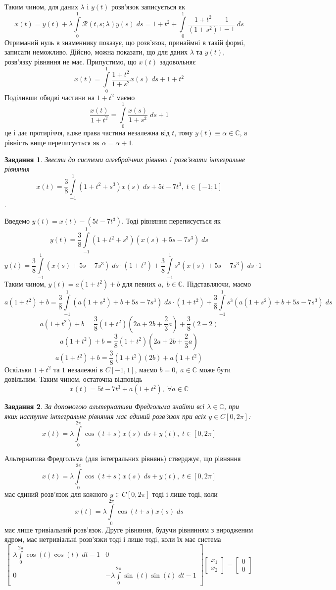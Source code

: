 \documentclass[10pt]{article}
\newtheorem{prob}{Завдання}
\newcommand{\ds}{\;ds}
\let\oldint\int
\renewcommand{\int}{\oldint\limits}
\begin{document}
	Таким чином, для даних $\lambda$ і $y(t)$ розв’язок записується як
	\[x(t)=y(t)+\lambda\int_{0}^1\mathcal{R}(t, s;\lambda)y( s)\;d s=1+t^2+\int_{0}^1\frac{1+t^2}{(1+s^2)}\frac{1}{1-1}\ds\]
	Отриманий нуль в знаменнику показує, що розв’язок, принаймні в такій формі, записати неможливо. Дійсно, можна показати, що для даних
	$\lambda$ та $y(t)$, розв’язку рівняння не має. Припустимо, що $x(t)$ задовольняє
	\[x(t)=\int_0^1\frac{1+t^2}{1+s^2}x(s)\ds+1+t^2\]
	Поділивши обидві частини на $1+t^2$ маємо
	\[\frac{x(t)}{1+t^2}=\int_0^1\frac{x(s)}{1+s^2}\ds+1\]
	це і дає протиріччя, адже права частина незалежна від $t$, тому $y(t)\equiv\alpha\in\mathbb{C}$, а рівність вище переписується як
	$\alpha=\alpha+1$.
\begin{prob}Звести до системи алгебраїчних рівнянь і розв’язати інтегральне рівняння
	\[x(t)=\frac{3}{8}\int_{-1}^1(1+t^2+s^3)x(s)\ds+5t-7t^3,\;t\in[-1;1]\].
\end{prob}
Введемо $y(t)=x(t)-(5t-7t^3)$. Тоді рівняння переписується як
	\[y(t)=\frac{3}{8}\int_{-1}^1(1+t^2+s^3)(x(s)+5s-7s^3)\ds\]
	\[y(t)=\frac{3}{8}\int_{-1}^1(x(s)+5s-7s^3)\ds\cdot(1+t^2)+\frac{3}{8}\int_{-1}^1s^3(x(s)+5s-7s^3)\ds\cdot1\]
	Таким чином, $y(t)=a(1+t^2)+b$ для певних $a,\;b\in\mathbb{C}$. Підставляючи, маємо
	\[a(1+t^2)+b=\frac{3}{8}\int_{-1}^1(a(1+s^2)+b+5s-7s^3)\ds\cdot(1+t^2)+\frac{3}{8}\int_{-1}^1s^3(a(1+s^2)+b+5s-7s^3)\ds\]
	\[a(1+t^2)+b=\frac{3}{8}(1+t^2)(2a+2b+\frac{2}{3}a)+\frac{3}{8}(2-2)\]
	\[a(1+t^2)+b=\frac{3}{8}(1+t^2)(2a+2b+\frac{2}{3}a)\]
	\[a(1+t^2)+b=\frac{3}{8}(1+t^2)(2b)+a(1+t^2)\]
	Оскільки $1+t^2$ та $1$ незалежні в $C[-1,1]$, маємо $b=0,\;a\in\mathbb{C}$ може бути довільним. Таким чином, остаточна відповідь
	\[x(t)=5t-7t^3+a(1+t^2),\;\forall a\in\mathbb{C}\]
\begin{prob}За допомогою альтернативи Фредгольма знайти всі $\lambda\in\mathbb{C}$, при яких наступне інтегральне рівняння має єдиний
	розв’язок при всіх $y\in C[0,2\pi]$:
	\[x(t)=\lambda\int_0^{2\pi}\cos(t+s)x(s)\ds+y(t),\;t\in[0,2\pi]\]
\end{prob}
Альтернатива Фредгольма (для інтегральних рівнянь) стверджує, що рівняння 
	\[x(t)=\lambda\int_0^{2\pi}\cos(t+s)x(s)\ds+y(t),\;t\in[0,2\pi]\]
	має єдиний розв’язок для кожного $y\in C[0,2\pi]$ тоді і лише тоді, коли
	\[x(t)=\lambda\int_0^{2\pi}\cos(t+s)x(s)\ds\]
має лише тривіальний розв’язок. Друге рівняння, будучи рівнянням з виродженим ядром,
має нетривіальні розв’язки тоді і лише тоді, коли їх має система
\[\begin{bmatrix}\lambda\int_0^{2\pi}\cos(t)\cos(t)\;dt-1&0\\0&-\lambda\int_0^{2\pi}\sin(t)\sin(t)\;dt-1\end{bmatrix}
	\begin{bmatrix}x_1\\x_2\end{bmatrix}=\begin{bmatrix}0\\0\end{bmatrix}\]
\end{document}
